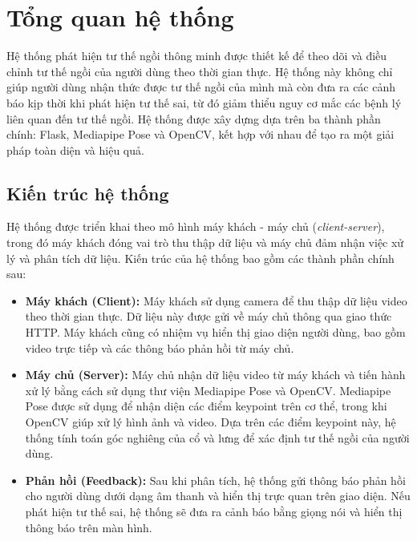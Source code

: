 \documentclass[conference]{IEEEtran}
\begin{document}
\section{Tổng quan hệ thống}
Hệ thống phát hiện tư thế ngồi thông minh được thiết kế để theo dõi và điều chỉnh tư thế ngồi của người dùng theo thời gian thực. Hệ thống này không chỉ giúp người dùng nhận thức được tư thế ngồi của mình mà còn đưa ra các cảnh báo kịp thời khi phát hiện tư thế sai, từ đó giảm thiểu nguy cơ mắc các bệnh lý liên quan đến tư thế ngồi. Hệ thống được xây dựng dựa trên ba thành phần chính: Flask, Mediapipe Pose và OpenCV, kết hợp với nhau để tạo ra một giải pháp toàn diện và hiệu quả.

\subsection{Kiến trúc hệ thống}
Hệ thống được triển khai theo mô hình máy khách - máy chủ (\textit{client-server}), trong đó máy khách đóng vai trò thu thập dữ liệu và máy chủ đảm nhận việc xử lý và phân tích dữ liệu. Kiến trúc của hệ thống bao gồm các thành phần chính sau:

\begin{itemize}
    \item \textbf{Máy khách (Client):} Máy khách sử dụng camera để thu thập dữ liệu video theo thời gian thực. Dữ liệu này được gửi về máy chủ thông qua giao thức HTTP. Máy khách cũng có nhiệm vụ hiển thị giao diện người dùng, bao gồm video trực tiếp và các thông báo phản hồi từ máy chủ.
    \item \textbf{Máy chủ (Server):} Máy chủ nhận dữ liệu video từ máy khách và tiến hành xử lý bằng cách sử dụng thư viện Mediapipe Pose và OpenCV. Mediapipe Pose được sử dụng để nhận diện các điểm keypoint trên cơ thể, trong khi OpenCV giúp xử lý hình ảnh và video. Dựa trên các điểm keypoint này, hệ thống tính toán góc nghiêng của cổ và lưng để xác định tư thế ngồi của người dùng.
    \item \textbf{Phản hồi (Feedback):} Sau khi phân tích, hệ thống gửi thông báo phản hồi cho người dùng dưới dạng âm thanh và hiển thị trực quan trên giao diện. Nếu phát hiện tư thế sai, hệ thống sẽ đưa ra cảnh báo bằng giọng nói và hiển thị thông báo trên màn hình.
\end{itemize}
\end{document}
